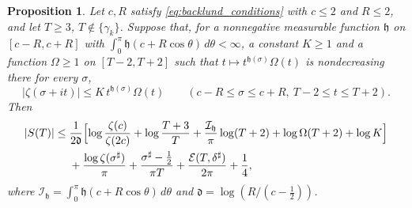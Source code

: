 \documentclass[11pt,a4paper]{article}
\makeatletter
\numberwithin{equation}{section}
\DeclareRobustCommand{\CGeqref}[1]{\eqref{#1}}
\let\CG@origeqref\eqref
\newcommand{\CG@gettip}[1]{\@ifundefined{CGTip@#1}{#1}{\csname CGTip@#1\endcsname}}
\DeclareRobustCommand{\CGeqref}[1]{\pdftooltip{\CG@origeqref{#1}}{\CG@gettip{#1}}}
\newtheorem{proposition}[theorem]{Proposition}
\theoremstyle{definition}
\theoremstyle{remark}
\makeatother
\begin{document}
\begin{proposition}\label{prop:master}
Let $c,R$ satisfy \CGeqref{eq:backlund_conditions} with $c\le2$ and $R\le2$, and let $T\ge3$, $T\notin\{\gamma_k\}$. Suppose that, for a nonnegative measurable function $\mathfrak h$ on $[c-R,c+R]$ with $\int_0^\pi\mathfrak h(c+R\cos\theta)\,d\theta<\infty$, a constant $K\ge1$ and a function $\Omega\ge1$ on $[T-2,T+2]$ such that $t\mapsto t^{\mathfrak h(\sigma)}\Omega(t)$ is nondecreasing there for every $\sigma$,
\begin{equation}
|\zeta(\sigma+it)|\le K\,t^{\mathfrak h(\sigma)}\Omega(t)\qquad(c-R\le\sigma\le c+R,\ T-2\le t\le T+2).
\label{eq:zeta_hyp}
\end{equation}
Then
\begin{equation}
\begin{split}
|S(T)|\le{}&\frac1{2\mathfrak d}\Bigl[\log\frac{\zeta(c)}{\zeta(2c)}+\log\frac{T+3}T+\frac{\mathcal I_{\mathfrak h}}\pi\log(T+2)+\log\Omega(T+2)+\log K\Bigr]\\
&+\frac{\log\zeta(\sigma^\sharp)}\pi+\frac{\sigma^\sharp-\frac12}{\pi T}+\frac{\mathcal E(T,\delta^\sharp)}{2\pi}+\frac14,
\end{split}
\label{eq:master}
\end{equation}
where $\mathcal I_{\mathfrak h}=\int_0^\pi\mathfrak h(c+R\cos\theta)\,d\theta$ and $\mathfrak d=\log(R/(c-\frac12))$.
\end{proposition}
\end{document}
